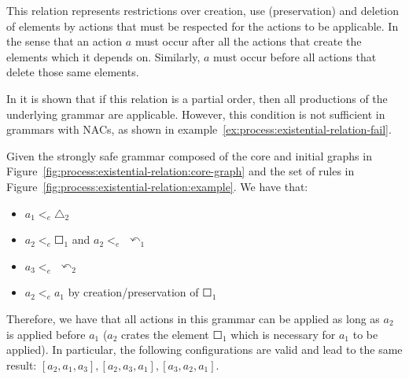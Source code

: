 This relation represents restrictions over creation, use (preservation) and deletion of elements by actions that must be respected for the actions to be applicable. In the sense that an action $a$ must occur after all the actions that create the elements which it depends on. Similarly, $a$ must occur before all actions that delete those same elements.

In \cite{Corradini1996} it is shown that if this relation is a partial order, then all productions of the underlying grammar are applicable. However, this condition is not sufficient in grammars with NACs, as shown in example~\ref{ex:process:existential-relation-fail}.

\begin{example}\label{ex:process:existential-relation} Given the strongly safe grammar composed of the core and initial graphs in Figure~\ref{fig:process:existential-relation:core-graph} and the set of rules in Figure~\ref{fig:process:existential-relation:example}. We have that:

\begin{itemize}
  \item $a_1 <_e \triangle_2$
  \item $a_2 <_e \Square_1$ and $a_2 <_e$ $\curvearrowleft_1$
  \item $a_3 <_e$ $\curvearrowleft_2$
  \item $a_2 <_e a_1$ by creation/preservation of $\Square_1$
\end{itemize}

  Therefore, we have that all actions in this grammar can be applied as long as $a_2$ is applied before $a_1$ ($a_2$ crates the element $\Square_1$ which is necessary for $a_1$ to be applied).
  In particular, the following configurations are valid and lead to the same result: $[a_2,a_1,a_3],[a_2,a_3,a_1],[a_3,a_2,a_1]$.


\end{example}
